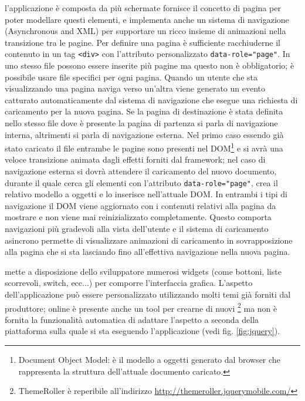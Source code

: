             l'applicazione è composta da più schermate \jqm{} fornisce
            il concetto di pagina per poter modellare questi elementi, e
            implementa anche un sistema di navigazione \ajax{} (Asynchronous
            \js{} and XML) per supportare un ricco insieme di animazioni
            nella transizione tra le pagine. Per definire una pagina è
            sufficiente racchiuderne il contenuto in un tag \verb|<div>| con
            l'attributo personalizzato \verb|data-role="page"|. In uno stesso
            file \html{} possono essere inserite più pagine ma questo non è
            obbligatorio; è possibile usare file \html{} specifici per ogni pagina.
            Quando un utente che sta visualizzando una pagina naviga verso
            un'altra viene generato un evento catturato automaticamente dal
            sistema di navigazione \ajax{} che esegue una richiesta di caricamento
            per la nuova pagina. Se la pagina di destinazione è stata definita
            nello stesso file dove è presente la pagina di partenza si parla di
            navigazione interna, altrimenti si parla di navigazione esterna. Nel
            primo caso essendo già stato caricato il file \html{} entrambe le
            pagine sono presenti nel DOM\footnote{Document Object Model: è il
            modello a oggetti \js{} generato dal browser che rappresenta la
            struttura dell'attuale documento \html{} caricato.} e si avrà una
            veloce transizione animata dagli effetti forniti dal frame\-work;
            nel caso di navigazione esterna si dovrà attendere il caricamento
            del nuovo documento, durante il quale \jqm{} cerca gli
            elementi \html{} con l'attributo \verb|data-role="page"|, crea il
            relativo modello a oggetti e lo inserisce nell'attuale DOM. In
            entrambi i tipi di navigazione il DOM viene aggiornato con i
            contenuti relativi alla pagina da mostrare e non viene mai
            reinizializzato completamente. Questo comporta navigazioni più
            gradevoli alla vista dell'utente e il sistema di caricamento
            asincrono permette di visualizzare animazioni di caricamento in
            sovrapposizione alla pagina che si sta lasciando fino all'effettiva
            navigazione nella nuova pagina.

            \jqm{} mette a disposizione dello sviluppatore numerosi
            widgets (come bottoni, liste scorrevoli, switch, ecc...) per
            comporre l'interfaccia grafica. L'aspetto dell'applicazione può
            essere personalizzato utilizzando molti temi già forniti dal
            produttore; online è presente anche un tool per crearne di nuovi
            \footnote{ThemeRoller è reperibile all'indirizzo
            \url{http://themeroller.jquerymobile.com/}} ma non è fornita la
            funzionalità automatica di adattare l'aspetto a seconda della
            piattaforma sulla quale si sta eseguendo l'applicazione (vedi fig.
            \ref{fig:jquery}).

